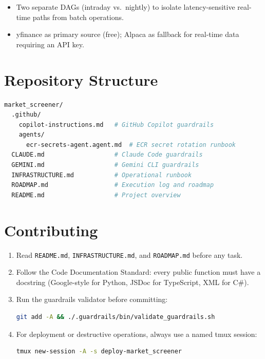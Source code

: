 \documentclass[11pt,a4paper]{article}
\begin{document}
\begin{itemize}
  \item Two separate DAGs (intraday vs.\ nightly) to isolate latency-sensitive
    real-time paths from batch operations.
  \item yfinance as primary source (free); Alpaca as fallback for real-time data
    requiring an API key.
\end{itemize}


\section{Repository Structure}
\begin{lstlisting}[language=bash,caption={Top-level directory layout}]
market_screener/
  .github/
    copilot-instructions.md   # GitHub Copilot guardrails
    agents/
      ecr-secrets-agent.agent.md  # ECR secret rotation runbook
  CLAUDE.md                   # Claude Code guardrails
  GEMINI.md                   # Gemini CLI guardrails
  INFRASTRUCTURE.md           # Operational runbook
  ROADMAP.md                  # Execution log and roadmap
  README.md                   # Project overview
\end{lstlisting}

\section{Contributing}
\begin{enumerate}
  \item Read \texttt{README.md}, \texttt{INFRASTRUCTURE.md}, and \texttt{ROADMAP.md} before any task.
  \item Follow the Code Documentation Standard: every public function must have
    a docstring (Google-style for Python, JSDoc for TypeScript, XML for C\#).
  \item Run the guardrails validator before committing:
    \begin{lstlisting}[language=bash]
git add -A && ./.guardrails/bin/validate_guardrails.sh
    \end{lstlisting}
  \item For deployment or destructive operations, always use a named tmux session:
    \begin{lstlisting}[language=bash]
tmux new-session -A -s deploy-market_screener
    \end{lstlisting}
\end{enumerate}
\end{document}
